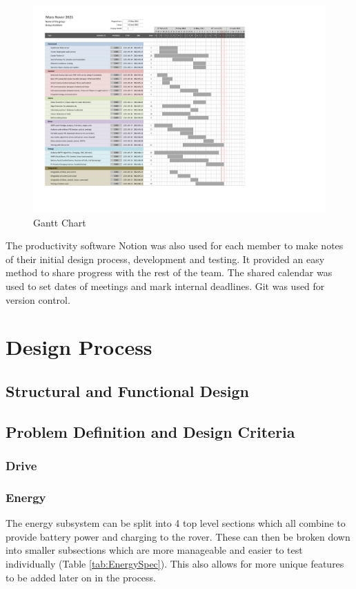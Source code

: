 \documentclass[10pt,twoside]{article}
\begin{document}
\begin{figure}[hbt]
    \centering
    \includegraphics[scale = 0.66,trim={1cm 3cm 8cm 0},clip]{GanttChart.pdf}
    \caption{Gantt Chart}
    \label{fig:GanttChart}
\end{figure}

The productivity software Notion was also used for each member to make notes of their initial design process, development and testing. It provided an easy method to share progress with the rest of the team. The shared calendar was used to set dates of meetings and mark internal deadlines. Git was used for version control.

\newpage
\section{Design Process}
\subsection{Structural and Functional Design}
\subsection{Problem Definition and Design Criteria}

\subsubsection{Drive}

\subsubsection{Energy}
The energy subsystem can be split into 4 top level sections which all combine to provide battery power and charging to the rover. These can then be broken down into smaller subsections which are more manageable and easier to test individually (Table \ref{tab:EnergySpec}). This also allows for more unique features to be added later on in the process. 
\end{document}
